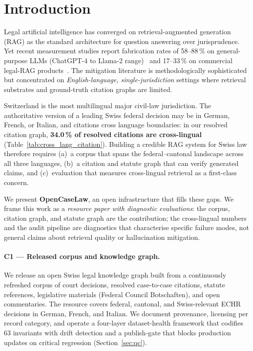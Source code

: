 \documentclass[11pt,a4paper]{article}
\begin{document}
\section{Introduction}\label{sec:intro}

Legal artificial intelligence has converged on retrieval-augmented generation (RAG) as the standard architecture for question answering over jurisprudence. Yet recent measurement studies report fabrication rates of 58--88\,\% on general-purpose LLMs (ChatGPT-4 to Llama-2 range)~\cite{dahl2024} and 17--33\,\% on commercial legal-RAG products~\cite{magesh2024}. The mitigation literature is methodologically sophisticated but concentrated on \emph{English-language, single-jurisdiction} settings where retrieval substrates and ground-truth citation graphs are limited.

Switzerland is the most multilingual major civil-law jurisdiction. The authoritative version of a leading Swiss federal decision may be in German, French, or Italian, and citations cross language boundaries: in our resolved citation graph, \textbf{34.0\,\% of resolved citations are cross-lingual} (Table~\ref{tab:cross_lang_citation}). Building a credible RAG system for Swiss law therefore requires (a)~a corpus that spans the federal--cantonal landscape across all three languages, (b)~a citation and statute graph that can verify generated claims, and (c)~evaluation that measures cross-lingual retrieval as a first-class concern.

We present \textbf{OpenCaseLaw}, an open infrastructure that fills these gaps. We frame this work as a \emph{resource paper with diagnostic evaluations}: the corpus, citation graph, and statute graph are the contribution; the cross-lingual numbers and the audit pipeline are diagnostics that characterise specific failure modes, not general claims about retrieval quality or hallucination mitigation.

\paragraph{C1 --- Released corpus and knowledge graph.} We release an open Swiss legal knowledge graph built from a continuously refreshed corpus of court decisions, resolved case-to-case citations, statute references, legislative materials (Federal Council Botschaften), and open commentaries. The resource covers federal, cantonal, and Swiss-relevant ECHR decisions in German, French, and Italian. We document provenance, licensing per record category, and operate a four-layer dataset-health framework that codifies 63 invariants with drift detection and a publish-gate that blocks production updates on critical regression (Section~\ref{sec:qc}).
\end{document}
